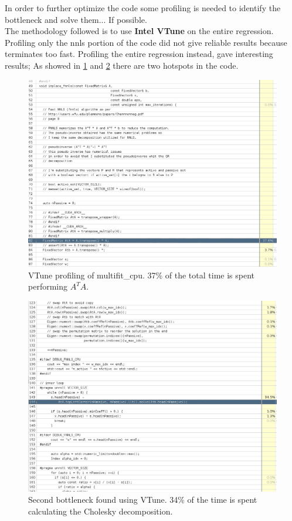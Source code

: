 In order to further optimize the code some profiling is needed to identify the bottleneck and solve them... If possible. \\
The methodology followed is to use \textbf{Intel VTune} on the entire regression. Profiling only the nnls portion of the code did not give reliable results because terminates too fast. Profiling the entire regression instead, gave interesting results; As showed in \ref{img:vtune_eigen_01} and \ref{img:vtune_eigen_02} there are two hotspots in the code. \\
\begin{figure}[ht]
  \includegraphics[width=\textwidth]{img/vtune_eigen_01}
  \caption{VTune profiling of multifit\_cpu. 37\% of the total time is spent performing $A^TA$.}
  \label{img:vtune_eigen_01}
\end{figure}
\begin{figure}[ht]
  \includegraphics[width=\textwidth]{img/vtune_eigen_02}
  \caption{Second bottleneck found using VTune. 34\% of the time is spent calculating the Cholesky decomposition.}
  \label{img:vtune_eigen_02}
\end{figure}
